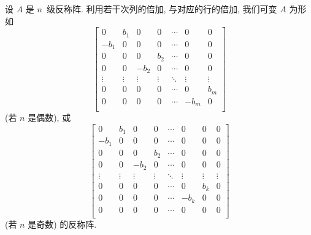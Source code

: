 \begin{theorem}
    设 \(A\) 是 \(n\)~级反称阵.
    利用若干次列的倍加, 与对应的行的倍加,
    我们可变 \(A\) 为形如
    \begin{equation}
        \begin{bmatrix}
            0      & b_1    & 0      & 0      & \cdots & 0      & 0      \\
            -b_1   & 0      & 0      & 0      & \cdots & 0      & 0      \\
            0      & 0      & 0      & b_2    & \cdots & 0      & 0      \\
            0      & 0      & -b_2   & 0      & \cdots & 0      & 0      \\
            \vdots & \vdots & \vdots & \vdots & \ddots & \vdots & \vdots \\
            0      & 0      & 0      & 0      & \cdots & 0      & b_m    \\
            0      & 0      & 0      & 0      & \cdots & -b_m   & 0      \\
        \end{bmatrix}
        \label{eq:C3201}
    \end{equation}
    (若 \(n\) 是偶数), 或
    \begin{equation}
        \begin{bmatrix}
            0      & b_1    & 0      & 0      & \cdots & 0      & 0      & 0      \\
            -b_1   & 0      & 0      & 0      & \cdots & 0      & 0      & 0      \\
            0      & 0      & 0      & b_2    & \cdots & 0      & 0      & 0      \\
            0      & 0      & -b_2   & 0      & \cdots & 0      & 0      & 0      \\
            \vdots & \vdots & \vdots & \vdots & \ddots & \vdots & \vdots & \vdots \\
            0      & 0      & 0      & 0      & \cdots & 0      & b_k    & 0      \\
            0      & 0      & 0      & 0      & \cdots & -b_k   & 0      & 0      \\
            0      & 0      & 0      & 0      & \cdots & 0      & 0      & 0      \\
        \end{bmatrix}
        \label{eq:C3202}
    \end{equation}
    (若 \(n\) 是奇数) 的反称阵.


\end{theorem}
